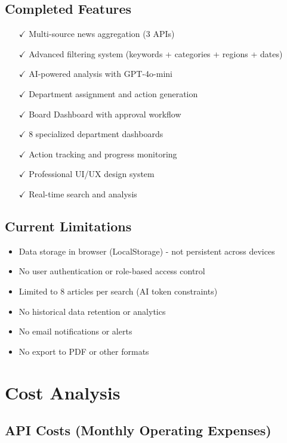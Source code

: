 \documentclass[11pt,a4paper]{article}
\begin{document}
\subsection{Completed Features}
\begin{itemize}[leftmargin=*]
    \item[$\checkmark$] Multi-source news aggregation (3 APIs)
    \item[$\checkmark$] Advanced filtering system (keywords + categories + regions + dates)
    \item[$\checkmark$] AI-powered analysis with GPT-4o-mini
    \item[$\checkmark$] Department assignment and action generation
    \item[$\checkmark$] Board Dashboard with approval workflow
    \item[$\checkmark$] 8 specialized department dashboards
    \item[$\checkmark$] Action tracking and progress monitoring
    \item[$\checkmark$] Professional UI/UX design system
    \item[$\checkmark$] Real-time search and analysis
\end{itemize}

\subsection{Current Limitations}
\begin{itemize}[leftmargin=*]
    \item Data storage in browser (LocalStorage) - not persistent across devices
    \item No user authentication or role-based access control
    \item Limited to 8 articles per search (AI token constraints)
    \item No historical data retention or analytics
    \item No email notifications or alerts
    \item No export to PDF or other formats
\end{itemize}

\section{Cost Analysis}

\subsection{API Costs (Monthly Operating Expenses)}
\end{document}
